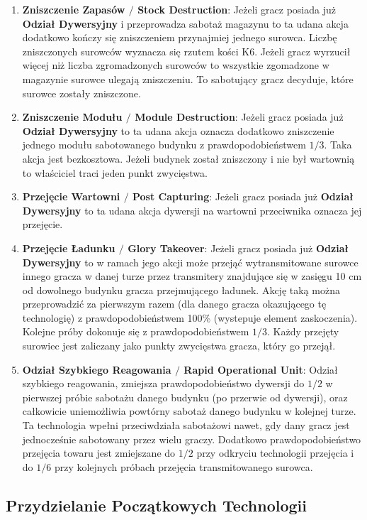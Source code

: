 \documentclass[11pt,a4paper]{article}
\begin{document}
\begin{enumerate}
\item \textbf{Zniszczenie Zapasów $/$ Stock Destruction}: Jeżeli gracz posiada już \textbf{Odział Dywersyjny} i przeprowadza sabotaż magazynu to ta udana akcja dodatkowo kończy się zniszczeniem przynajmiej jednego surowca. Liczbę zniszczonych surowców wyznacza się rzutem kości K6. Jeżeli gracz wyrzucił więcej niż liczba zgromadzonych surowców to wszystkie zgomadzone w magazynie surowce ulegają zniszczeniu. To sabotujący gracz decyduje, które surowce zostały zniszczone.  
\item \textbf{Zniszczenie Modułu $/$ Module Destruction}: Jeżeli gracz posiada już \textbf{Odział Dywersyjny} to ta udana akcja oznacza dodatkowo zniszczenie jednego modułu sabotowanego budynku z prawdopodobieństwem $1/3$. Taka akcja jest bezkosztowa. Jeżeli budynek został zniszczony i nie był wartownią to właściciel traci jeden punkt zwycięstwa.
\item \textbf{Przejęcie Wartowni $/$ Post Capturing}: Jeżeli gracz posiada już \textbf{Odział Dywersyjny} to ta udana akcja dywersji na wartowni przeciwnika oznacza jej przejęcie.
\item \textbf{Przejęcie Ładunku $/$ Glory Takeover}: Jeżeli gracz posiada już \textbf{Odział Dywersyjny} to w ramach jego akcji może przejąć wytransmitowane surowce innego gracza w danej turze przez transmitery znajdujące się w zasięgu 10 cm od dowolnego budynku gracza przejmującego ładunek. Akcję taką można przeprowadzić za pierwszym razem (dla danego gracza okazującego tę technologię) z prawdopodobieństwem 100\% (wystepuje element zaskoczenia). Kolejne próby dokonuje się z prawdopodobieństwem $1/3$. Każdy przejęty surowiec jest zaliczany jako punkty zwycięstwa gracza, który go przejął. 
\item \textbf{Odział Szybkiego Reagowania $/$ Rapid Operational Unit}: Odział szybkiego reagowania, zmiejsza prawdopodobieństwo dywersji do $1/2$ w pierwszej próbie sabotażu danego budynku (po przerwie od dywersji), oraz całkowicie uniemożliwia powtórny sabotaż danego budynku w kolejnej turze. Ta technologia wpełni przeciwdziała sabotażowi nawet, gdy dany gracz jest jednocześnie sabotowany przez wielu graczy. Dodatkowo prawdopodobieństwo przejęcia towaru jest zmiejszane do $1/2$ przy odkryciu technologii przejęcia i do $1/6$ przy kolejnych próbach przejęcia transmitowanego surowca.
\end{enumerate}

\subsection{Przydzielanie Początkowych Technologii}
\end{document}
